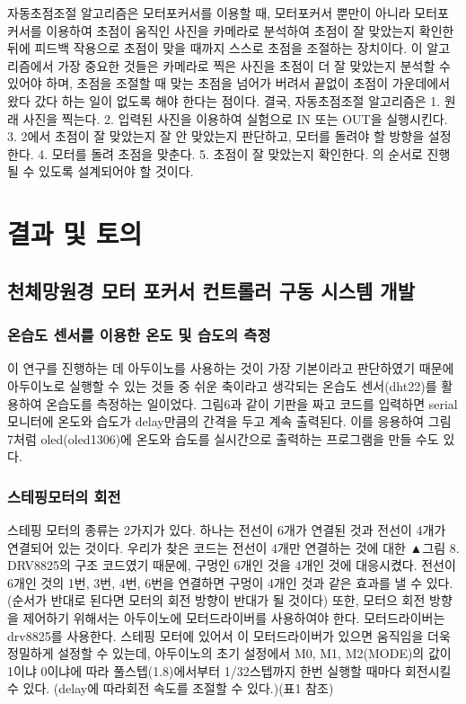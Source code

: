   자동초점조절 알고리즘은 모터포커서를 이용할 때, 모터포커서 뿐만이 아니라 모터포커서를 이용하여 초점이 움직인 사진을 카메라로 분석하여 초점이 잘 맞았는지 확인한 뒤에 피드백 작용으로 초점이 맞을 때까지 스스로 초점을 조절하는 장치이다. 이 알고리즘에서 가장 중요한 것들은 카메라로 찍은 사진을 초점이 더 잘 맞았는지 분석할 수 있어야 하며, 초점을 조절할 때 맞는 초점을 넘어가 버려서 끝없이 초점이 가운데에서 왔다 갔다 하는 일이 없도록 해야 한다는 점이다.
 결국, 자동초점조절 알고리즘은
 1. 원래 사진을 찍는다.
 2. 입력된 사진을 이용하여 실험으로 IN 또는 OUT을 실행시킨다.
 3. 2에서 초점이 잘 맞았는지 잘 안 맞았는지 판단하고, 모터를 돌려야 할 방향을 설정한다. 
 4. 모터를 돌려 초점을 맞춘다.
 5. 초점이 잘 맞았는지 확인한다.
 의 순서로 진행될 수 있도록 설계되어야 할 것이다.
 
\section{결과 및 토의}

\subsection{천체망원경 모터 포커서 컨트롤러 구동 시스템 개발}

\subsubsection{온습도 센서를 이용한 온도 및 습도의 측정}

 이 연구를 진행하는 데 아두이노를 사용하는 것이 가장 기본이라고 판단하였기 때문에 아두이노로 실행할 수 있는 것들 중 쉬운 축이라고 생각되는 온습도 센서(dht22)를 활용하여 온습도를 측정하는 일이었다. 그림6과 같이 기판을 짜고 코드를 입력하면 serial 모니터에 온도와 습도가 delay만큼의 간격을 두고 계속 출력된다.
이를 응용하여 그림 7처럼 oled(oled1306)에 온도와 습도를 실시간으로 출력하는 프로그램을 만들 수도 있다.

\subsubsection{스테핑모터의 회전}

스테핑 모터의 종류는 2가지가 있다. 하나는 전선이 6개가 연결된 것과 전선이 4개가 연결되어 있는 것이다. 우리가 찾은 코드는 전선이 4개만 연결하는 것에 대한
▲그림 8. DRV8825의 구조
코드였기 때문에, 구멍인 6개인 것을 4개인 것에 대응시켰다. 전선이 6개인 것의 1번, 3번, 4번, 6번을 연결하면 구멍이 4개인 것과 같은 효과를 낼 수 있다. (순서가 반대로 된다면 모터의 회전 방향이 반대가 될 것이다) 또한, 모터으 회전 방향을 제어하기 위해서는 아두이노에 모터드라이버를 사용하여야 한다. 모터드라이버는 drv8825를 사용한다. 스테핑 모터에 있어서 이 모터드라이버가 있으면 움직임을 더욱 정밀하게 설정할 수 있는데, 아두이노의 초기 설정에서 M0, M1, M2(MODE)의 값이 1이냐 0이냐에 따라 풀스텝(1.8)에서부터 1/32스텝까지 한번 실행할 때마다 회전시킬 수 있다. (delay에 따라회전 속도를 조절할 수 있다.)(표1 참조)

